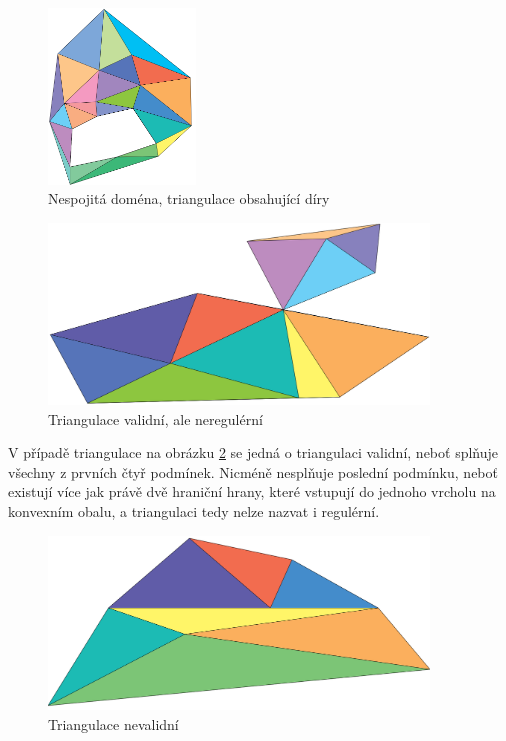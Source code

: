 \documentclass[12pt,a4paper]{article}
\begin{document}
\begin{figure}[h!]
\centering
\includegraphics[width=0.35\textwidth]{img/podm_domena.png}
\caption{Nespojitá doména, triangulace obsahující díry}
\label{fig:podm_domena}
\end{figure}

\begin{figure}[h!]
\centering
\includegraphics[width=0.9\textwidth]{img/vnr.png}
\caption{Triangulace validní, ale neregulérní}
\label{fig:trian_valid_not_reg}
\end{figure}

V případě triangulace na obrázku \ref{fig:trian_valid_not_reg} se
jedná o triangulaci validní, neboť splňuje všechny z prvních čtyř
podmínek. Nicméně nesplňuje poslední podmínku, neboť existují více jak
právě dvě hraniční hrany, které vstupují do jednoho vrcholu na
konvexním obalu, a triangulaci tedy nelze nazvat i regulérní.

\begin{figure}[h!]
\centering
\includegraphics[width=0.9\textwidth]{img/nv.png}
\caption{Triangulace nevalidní}
\label{fig:train_not_valid}
\end{figure}
\end{document}
